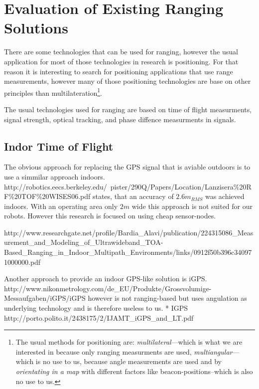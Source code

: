 \section{Evaluation of Existing Ranging Solutions}
There are some technologies that can be used for ranging, however the usual application for most of those technologies in research is positioning.
For that reason it is interesting to search for positioning applications that use range measurements, however many of those positioning technologies are base on other principles than multilateration\footnote{The usual methods for positioning are: \emph{multilateral}—which is what we are interested in because only ranging measurments are used, \emph{multiangular}—which is no use  to us, because angle measurements are used and by \emph{orientating in a map} with different factors like beacon-positions–which is also no use to us.}.
\cite{_multilateration_2015}

The usual technologies used for ranging are based on time of flight measurments, signal strength, optical tracking, and phase diffence measurments in signals.

\subsection{Indor Time of Flight}
The obvious approach for replacing the GPS signal that is aviable outdoors is to use a simmilar approach indoors.
http://robotics.eecs.berkeley.edu/~pister/290Q/Papers/Location/Lanzisera\%20RF\%20TOF\%20WISES06.pdf  states, that an accuracy of $2.6m_{RMS}$ was achieved indoors.
With an operating area only $2m$ wide this approach is not suited for our robots.
However this research is focused on using cheap sensor-nodes.

http://www.researchgate.net/profile/Bardia\_Alavi/publication/224315086\_Measurement\_and\_Modeling\_of\_Ultrawideband\_TOA-Based\_Ranging\_in\_Indoor\_Multipath\_Environments/links/0912f50b396c340971000000.pdf 

Another approach to provide an indoor GPS-like solution is iGPS. http://www.nikonmetrology.com/de\_EU/Produkte/Grossvolumige-Messaufgaben/iGPS/iGPS  however is not ranging-based but uses angulation as underlying technology and is therefore useless to us.
  * IGPS http://porto.polito.it/2438175/2/IJAMT\_iGPS\_and\_LT.pdf

